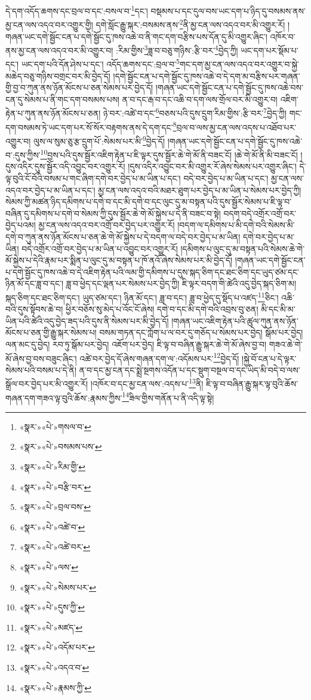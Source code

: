 དེ་དག་འདོད་ཆགས་དང་བྲལ་བ་དང་:བསལ་བ་\footnote{«སྣར་»«པེ་»གསལ་བ་}དང་། བསྡམས་པ་དང་དུལ་བས་ཡང་དག་པ་ཉིད་དུ་བསམས་ནས་མྱ་ངན་ལས་འདའ་བར་འགྱུར་གྱི། དགེ་སློང་རྒྱུ་སྐར་:བསམས་ནས་\footnote{«སྣར་»«པེ་»བསམས་པས་}ནི་མྱ་ངན་ལས་འདའ་བར་མི་འགྱུར་རོ། །གཞན་ཡང་དགེ་སྦྱོང་ངན་པ་དགེ་སྦྱོང་དུ་ཁས་འཆེ་བ་ནི་གང་དག་བརྩིས་པས་དོན་དུ་མི་འགྱུར་ཞིང་། འཁོར་བ་ནས་མྱ་ངན་ལས་འདའ་བར་མི་འགྱུར་བ། :རིམ་གྱིས་\footnote{«སྣར་»«པེ་»རིམ་གྱི་}ཟླ་བ་བཅུ་གཉིས་:རྩི་བར་\footnote{«སྣར་»«པེ་»བརྩི་བར་}བྱེད་ཀྱི། ཡང་དག་པར་སྡོམ་པ་དང་། ཡང་དག་པའི་དོན་ཤེས་པ་དང་། འདོད་ཆགས་དང་:བྲལ་བ་\footnote{«སྣར་»«པེ་»བྲལ་བས་}གང་དག་མྱ་ངན་ལས་འདའ་བར་འགྱུར་བ་སྐྱེ་མཆེད་བཅུ་གཉིས་བགྲང་བར་མི་བྱེད་དོ། །དགེ་སྦྱོང་ངན་པ་དགེ་སྦྱོང་དུ་ཁས་འཆེ་བ་དེ་དག་མ་བརྩིས་པར་གཞན་གྱི་བྱ་བ་ཀུན་ནས་ཉོན་མོངས་པ་ཅན་སེམས་པར་བྱེད་དོ། །གཞན་ཡང་དགེ་སྦྱོང་ངན་པ་དགེ་སྦྱོང་དུ་ཁས་འཆེ་བས་ངན་དུ་སེམས་པ་ནི་གང་དག་བསམས་པས། ན་བ་དང་རྒ་བ་དང་འཆི་བ་དག་ལས་གྲོལ་བར་མི་འགྱུར་བ། འཇིག་རྟེན་པ་ཀུན་ནས་ཉོན་མོངས་པ་ཅན། ཉེ་བར་:འཚེ་བ་དང་\footnote{«སྣར་»«པེ་»འཚེ་བ་}བཅས་པའི་དུས་དྲུག་རིམ་གྱིས་:རྩི་བར་\footnote{«སྣར་»«པེ་»འཚེ་བར་}བྱེད་ཀྱི། གང་དག་བསམས་ཏེ་ཡང་དག་པར་སོ་སོར་བརྟགས་ནས་དེ་དག་དང་\footnote{«སྣར་»«པེ་»ལས་}བྲལ་བ་ལས་མྱ་ངན་ལས་འདས་པ་འཐོབ་པར་འགྱུར་བ། ལུས་ལ་སུམ་ཅུ་རྩ་དྲུག་པོ་:སེམས་པར་མི་\footnote{«སྣར་»«པེ་»སེམས་པར་}བྱེད་དོ། །གཞན་ཡང་དགེ་སྦྱོང་ངན་པ་དགེ་སྦྱོང་དུ་ཁས་འཆེ་བ་:དུས་ཀྱིས་\footnote{«སྣར་»«པེ་»དུས་ཀྱི་}བྱས་པའི་དུས་སྦྱོར་འཇིག་རྟེན་པ་ཇི་ལྟར་དུས་སྦྱོར་ཆེ་གེ་མོ་ནི་བཟང་ངོ། །ཆེ་གེ་མོ་ནི་མི་བཟང་ངོ། །དུས་འདིར་དུས་སྦྱོར་འདི་འབྱུང་བར་འགྱུར་རོ། །དུས་འདིར་འབྱུང་བར་མི་འགྱུར་རོ་ཞེས་སེམས་པར་འགྱུར་ཞིང་། དེ་ལྟ་བུའི་ངོ་བོའི་བསམ་པ་གང་ཞིག་དགེ་བར་བྱེད་པ་མ་ཡིན་པ་དང་། བདེ་བར་བྱེད་པ་མ་ཡིན་པ་དང་། མྱ་ངན་ལས་འདའ་བར་བྱེད་པ་མ་ཡིན་པ་དང་། མྱ་ངན་ལས་འདའ་བའི་མཐར་ཐུག་པར་བྱེད་པ་མ་ཡིན་པ་སེམས་པར་བྱེད་ཀྱི། སེམས་ཀྱི་མཚན་ཉིད་དམིགས་པ་དགེ་བ་དང་མི་དགེ་བ་དང་ལུང་དུ་མ་བསྟན་པའི་དུས་སྦྱོར་སེམས་པ་ཇི་ལྟ་བ་བཞིན་དུ་དམིགས་པ་དགེ་བ་སེམས་ཀྱི་དུས་སྦྱོར་ཆེ་གེ་མོ་སྐྱེས་པ་དེ་ནི་བཟང་བ་སྟེ། བདག་བདེ་འགྲོར་འགྲོ་བར་བྱེད་པའམ། མྱ་ངན་ལས་འདའ་བར་འགྲོ་བར་བྱེད་པར་འགྱུར་རོ། །བདག་ལ་དམིགས་པ་མི་དགེ་བའི་སེམས་མི་དགེ་བ་ཀུན་ནས་ཉོན་མོངས་པ་ཅན་ཆེ་གེ་མོ་སྐྱེས་པ་དེ་བདག་ལ་བདེ་བར་བྱེད་པ་མ་ཡིན། དགེ་བར་བྱེད་པ་མ་ཡིན། བདེ་འགྲོར་འགྲོ་བར་བྱེད་པ་མ་ཡིན་པ་འབྱུང་བར་འགྱུར་རོ། །དམིགས་པ་ལུང་དུ་མ་བསྟན་པའི་སེམས་ཆེ་གེ་མོ་སྐྱེས་པ་དེའི་རྣམ་པར་སྨིན་པ་ལུང་དུ་མ་བསྟན་པ་ཁོ་ནའོ་ཞེས་སེམས་པར་མི་བྱེད་དོ། །གཞན་ཡང་དགེ་སྦྱོང་ངན་པ་དགེ་སྦྱོང་དུ་ཁས་འཆེ་བ་དེ་འཇིག་རྟེན་པའི་ལམ་གྱི་དམིགས་པ་དུས་སྐད་ཅིག་དང་ཐང་ཅིག་དང་ཡུད་ཙམ་དང་ཉིན་མོ་དང་ཟླ་བ་དང་། ཟླ་བ་ཕྱེད་དང་ལྡན་པར་སེམས་པར་བྱེད་ཀྱི། ཇི་ལྟར་བདག་གི་ཚེའི་འདུ་བྱེད་སྐད་ཅིག་མ། སྐད་ཅིག་དང་ཐང་ཅིག་དང་། ཡུད་ཙམ་དང་། ཉིན་མོ་དང་། ཟླ་བ་དང་། ཟླ་བ་ཕྱེད་དུ་སྡོད་པ་འཛད་\footnote{«སྣར་»«པེ་»མཛད་}ཅིང་། འཆི་བའི་དུས་སྟོབས་ཆེ་བ། ཕྱིར་བཅོས་སུ་མེད་པ་འོང་ངོ་ཞེས། དགེ་བ་དང་མི་དགེ་བའི་འབྲས་བུ་ཅན། མི་དང་མི་མ་ཡིན་པའི་ཚེའི་འདུ་བྱེད་ཟད་པའི་དུས་ནི་སེམས་པར་མི་བྱེད་དོ། །གཞན་ཡང་འཇིག་རྟེན་པའི་ཚུལ་ཀུན་ནས་ཉོན་མོངས་པ་ཅན་གྱི་རྒྱུ་སྐར་སེམས་པ། བསམ་གཏན་དང་ཀློག་པ་ལ་བར་དུ་གཅོད་པ་སེམས་པར་བྱེད། སྒོམ་པར་བྱེད། ལན་མང་དུ་བྱེད། རབ་ཏུ་སྒོམ་པར་བྱེད། འཇོག་པར་བྱེད། ཇི་ལྟ་བ་བཞིན་རྒྱུ་སྐར་ཆེ་གེ་མོ་ཞེས་བྱ་བ། གཟའ་ཆེ་གེ་མོ་ཞེས་བྱ་བས་བཟུང་ཞིང་། འཚེ་བར་བྱེད་དོ་ཞེས་གཞན་དག་ལ་:འདོམས་པར་\footnote{«སྣར་»«པེ་»འདོམ་པར་}བྱེད་དོ། །སྐྱེ་བོ་ངན་པ་དེ་ལྟར་སེམས་པའི་བསམ་པ་དེ་ནི། ན་བ་དང་མྱ་ངན་དང་སྨྲེ་སྔགས་འདོན་པ་དང་སྡུག་བསྔལ་བ་དང་ཡིད་མི་བདེ་བ་ལས་སྒྲོལ་བར་བྱེད་པར་མི་འགྱུར་རོ། །འཁོར་བ་དང་མྱ་ངན་ལས་:འདས་པ་\footnote{«སྣར་»«པེ་»འདའ་བ་}ནི། ཇི་ལྟ་བ་བཞིན་རྒྱུ་སྐར་ལྟ་བུའི་ཆོས་གཞན་དག་གཟའ་ལྟ་བུའི་ཆོས་:རྣམས་ཀྱིས་\footnote{«སྣར་»«པེ་»རྣམས་ཀྱི་}ཟིལ་གྱིས་གནོན་པ་ནི་འདི་ལྟ་སྟེ། 